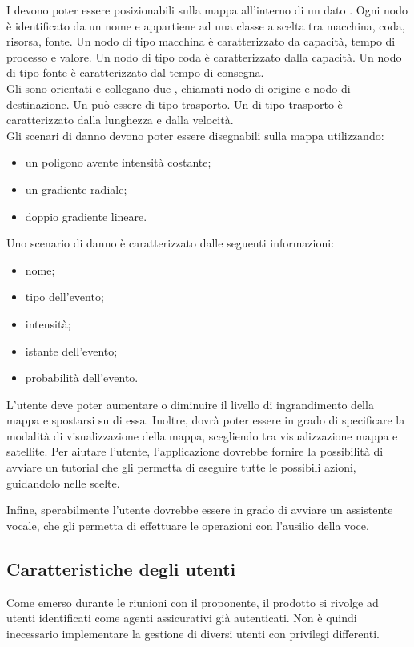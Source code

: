 	I  devono poter essere posizionabili sulla mappa all'interno di un dato . Ogni nodo è identificato da un nome e appartiene ad una classe a scelta tra macchina, coda, risorsa, fonte. Un nodo di tipo macchina è caratterizzato da capacità, tempo di processo e valore. Un nodo di tipo coda è caratterizzato dalla capacità. Un nodo di tipo fonte è caratterizzato dal tempo di consegna.\\
	Gli  sono orientati e collegano due , chiamati nodo di origine e nodo di destinazione. Un  può essere di tipo trasporto. Un  di tipo trasporto è caratterizzato dalla lunghezza e dalla velocità. \\
	Gli scenari di danno devono poter essere disegnabili sulla mappa utilizzando:
	\begin{itemize}
			\item un poligono avente intensità costante;
			\item un gradiente radiale;
			\item doppio gradiente lineare.
	\end{itemize}
	Uno scenario di danno è caratterizzato dalle seguenti informazioni:
		\begin{itemize}
		\item nome;
		\item tipo dell'evento;
		\item intensità;
		\item istante dell'evento;
		\item probabilità dell'evento.
		\end{itemize}
	L'utente deve poter aumentare o diminuire il livello di ingrandimento della mappa e spostarsi su di essa. Inoltre, dovrà poter essere in grado di specificare la modalità di visualizzazione della mappa, scegliendo tra visualizzazione mappa e satellite.
	Per aiutare l'utente, l'applicazione dovrebbe fornire la possibilità di avviare un tutorial che gli permetta di eseguire tutte le possibili azioni, guidandolo nelle scelte.
	
		
	Infine, sperabilmente l'utente dovrebbe essere in grado di avviare un assistente vocale, che gli permetta di effettuare le operazioni con l'ausilio della voce.
\subsection{Caratteristiche degli utenti}
Come emerso durante le riunioni con il proponente, il prodotto si rivolge ad utenti identificati come agenti assicurativi già autenticati. Non è quindi inecessario implementare la gestione di diversi utenti con privilegi differenti.

